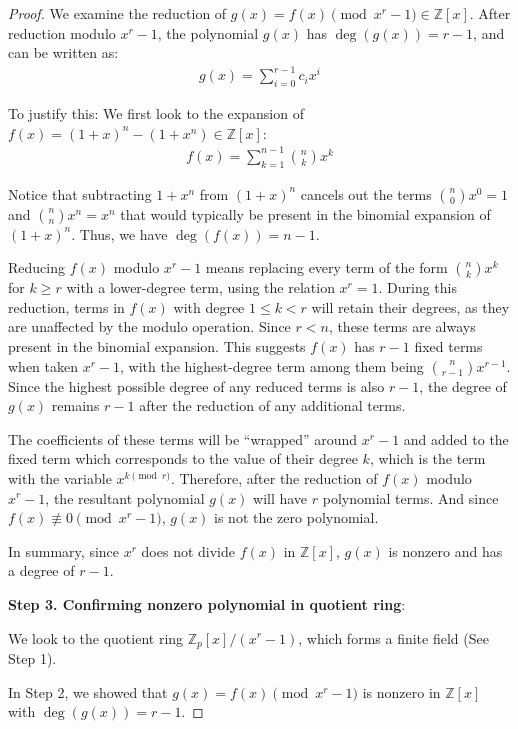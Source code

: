\documentclass{article}
\theoremstyle{plain}
\theoremstyle{definition}
\newcommand{\D}{r}
\begin{document}
\begin{proof}
We examine the reduction of $g(x) = f(x) \pmod{x^{\D}-1} \in \mathbb{Z}[x]$. After reduction modulo $x^\D - 1$, the polynomial $g(x)$ has $\deg(g(x)) = \D-1$, and can be written as:
\begin{align}
    g(x) = \sum_{i=0}^{\D-1} c_i x^i
\end{align}

To justify this: We first look to the expansion of  $f(x) = (1 + x)^n - (1 + x^n) \in \mathbb{Z}[x]$:
\begin{align}
    f(x) = \sum_{k=1}^{n-1} \binom{n}{k} x^k
\end{align}

Notice that subtracting $1+x^n$ from $(1+x)^n$ cancels out the terms $\binom{n}{0} x^0 = 1$ and $\binom{n}{n} x^n = x^n$ that would typically be present in the binomial expansion of $(1+x)^n$. Thus, we have $\deg(f(x))=n-1$.

Reducing $f(x)$ modulo $x^{\D} - 1$ means replacing every term of the form $\binom{n}{k} x^k$ for $k \geq \D$ with a lower-degree term, using the relation $x^\D = 1$. During this reduction, terms in $f(x)$ with degree $1 \leq k < \D$ will retain their degrees, as they are unaffected by the modulo operation. Since $\D < n$, these terms are always present in the binomial expansion. This suggests $f(x)$ has $\D-1$ fixed terms when taken $x^\D - 1$,  with the highest-degree term among them being $\binom{n}{\D-1} x^{\D-1}$. Since the highest possible degree of any reduced terms is also $\D-1$, the degree of $g(x)$ remains $\D-1$ after the reduction of any additional terms.

The coefficients of these terms will be ``wrapped'' around $x^\D - 1$ and added to the fixed term which corresponds to the value of their degree $k$, which is the term with the variable $x^{k \pmod{\D}}$. Therefore, after the reduction of $f(x)$ modulo $x^\D - 1$, the resultant polynomial $g(x)$ will have $\D$ polynomial terms. And since $f(x) \not\equiv 0 \pmod{x^\D - 1}$, $g(x)$ is not the zero polynomial.

In summary, since $x^\D $ does not divide $f(x)$ in $\mathbb{Z}[x]$, $g(x)$ is nonzero and has a degree of $\D-1$.

\textbf{Step 3. Confirming nonzero polynomial in quotient ring}:

We look to the quotient ring $\mathbb{Z}_p[x]/(x^{\D} - 1)$, which forms a finite field (See Step 1).

In Step 2, we showed that $g(x) = f(x) \pmod{x^{\D} - 1}$ is nonzero in $\mathbb{Z}[x]$ with $\deg(g(x)) = \D-1$.


\end{proof}
\end{document}
